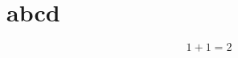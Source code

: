 \makeatletter
{}
\makeatother
\renewcommand{\theequation}{\thechapter-\arabic{equation}}
\renewcommand{\thefigure}{\thechapter-\arabic{figure}}
\renewcommand{\thetable}{\thechapter-\arabic{table}}
\appendix
\chapter{abcd}\label{cha:appendix1}
\begin{equation}
1+1=2
\end{equation}